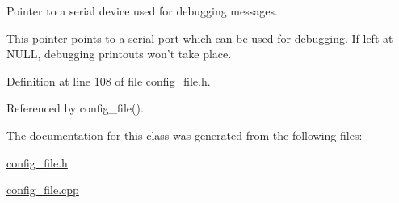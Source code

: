 Pointer to a serial device used for debugging messages. 

This pointer points to a serial port which can be used for debugging. If left at {\ttfamily N\-U\-L\-L}, debugging printouts won't take place. 

Definition at line 108 of file config\-\_\-file.\-h.



Referenced by config\-\_\-file().



The documentation for this class was generated from the following files\-:\begin{DoxyCompactItemize}
\item 
\hyperlink{config__file_8h}{config\-\_\-file.\-h}\item 
\hyperlink{config__file_8cpp}{config\-\_\-file.\-cpp}\end{DoxyCompactItemize}
